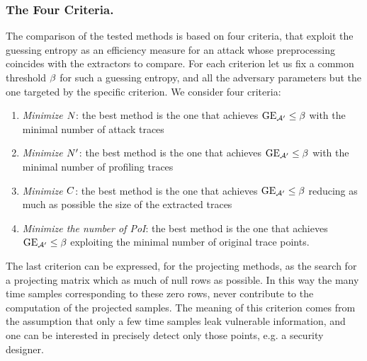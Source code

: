 \subsubsection{The Four Criteria.}
The comparison of the tested methods is based on four criteria, that exploit the guessing entropy as an efficiency measure for an attack whose preprocessing coincides with the extractors to compare. For each criterion let us fix a common threshold $\threshold$ for such a guessing entropy, and all the adversary parameters but the one targeted by the specific criterion. We consider four criteria: 
\begin{enumerate}
\item {\em Minimize $\numTraces[]$}: the best method is the one that achieves $\guessingEntropy_{\adversary'}\leq \threshold$ with the minimal number of attack traces
\item {\em Minimize $\numTraces[]'$}: the best method is the one that achieves $\guessingEntropy_{\adversary'}\leq \threshold$ with the minimal number of profiling traces
\item {\em Minimize $\newTraceLength$}: the best method is the one that achieves $\guessingEntropy_{\adversary'}\leq \threshold$ reducing as much as possible the size of the extracted traces
\item {\em Minimize the number of PoI}: the best method is the one that achieves $\guessingEntropy_{\adversary'}\leq \threshold$ exploiting the minimal number of original trace points.
\end{enumerate}
The last criterion can be expressed, for the projecting methods, as the search for a projecting matrix which as much of null rows as possible. In this way the many time samples corresponding to these zero rows, never contribute to the computation of the projected samples. The meaning of this criterion comes from the assumption that only a few time samples leak vulnerable information, and one can be interested in precisely detect only those points, e.g. a security designer.














